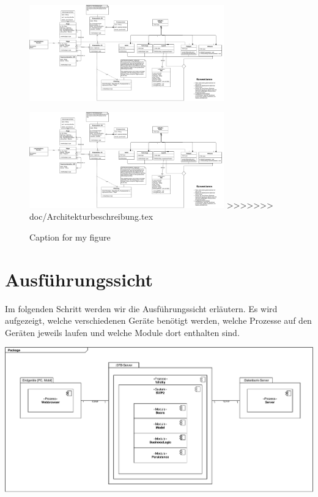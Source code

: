 \documentclass[enabledeprecatedfontcommands,fontsize=12pt,paper=a4,twoside]{scrartcl}
\begin{document}
 \begin{figure}
  \caption{Caption for my figure}
  \centering
  

  \includegraphics[width=0.75\textwidth]{UML/Model.pdf}

\includegraphics[width=0.75\textwidth]{UML/Model.pdf}
>>>>>>> doc/Architekturbeschreibung.tex
 \end{figure}

\section{Ausführungssicht}

\label{sec:ausfuehrung}


{ Im folgenden Schritt werden wir die Ausführungssicht erläutern. Es wird aufgezeigt, welche verschiedenen Geräte benötigt werden, welche Prozesse auf den Geräten jeweils laufen und welche Module dort enthalten sind.
}


\includegraphics[scale=0.5]{UML/06Ausfuehrungssicht.pdf}
\end{document}
